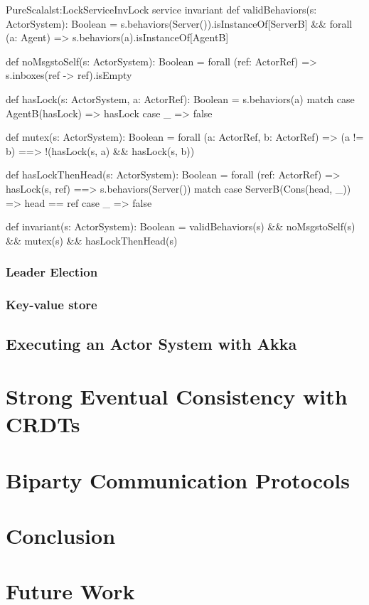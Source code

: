 \begin{Code}{PureScala}{lst:LockServiceInv}{Lock service invariant}
def validBehaviors(s: ActorSystem): Boolean = {
  s.behaviors(Server()).isInstanceOf[ServerB] &&
  forall { (a: Agent) =>
  	s.behaviors(a).isInstanceOf[AgentB]
  }
}

def noMsgstoSelf(s: ActorSystem): Boolean = forall { (ref: ActorRef) =>
  s.inboxes(ref -> ref).isEmpty
}

def hasLock(s: ActorSystem, a: ActorRef): Boolean = {
  s.behaviors(a) match {
    case AgentB(hasLock) => hasLock
    case _ => false
  }
}

def mutex(s: ActorSystem): Boolean = forall { (a: ActorRef, b: ActorRef) =>
  (a != b) ==> !(hasLock(s, a) && hasLock(s, b))
}

def hasLockThenHead(s: ActorSystem): Boolean = forall { (ref: ActorRef) =>
  hasLock(s, ref) ==> {
    s.behaviors(Server()) match {
      case ServerB(Cons(head, _)) => head == ref
      case _ => false
    }
  }
}

def invariant(s: ActorSystem): Boolean = {
  validBehaviors(s)  &&
  noMsgstoSelf(s)    &&
  mutex(s)           &&
  hasLockThenHead(s)
}
\end{Code}


\subsubsection*{Leader Election}


\subsubsection*{Key-value store}


\subsection{Executing an Actor System with Akka}
\label{traces}

\section{Strong Eventual Consistency with CRDTs}
\label{crdt}


\section{Biparty Communication Protocols}
\label{biparty}


\section{Conclusion}
\label{conclusion}


\section{Future Work}
\label{futurework}

\appendix


\clearpage





